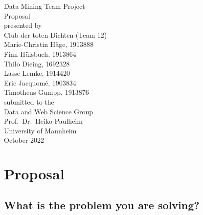 \documentclass[11pt,titlepage,oneside,openany]{book}
\begin{document}
\begin{titlepage}
	\vspace*{2cm}
  \begin{center}
   {\Large Data Mining Team Project\\}
   \vspace{2cm} 
   {Proposal\\}
   \vspace{2cm}
   {presented by\\
   	Club der toten Dichten (Team 12)\\
    Marie-Christin Häge, 1913888 \\
    Finn Hülsbuch, 1913864 \\
    Thilo Dieing, 1692328 \\
    Lasse Lemke, 1914420 \\
    Eric Jacquomé, 1903834 \\
    Timotheus Gumpp, 1913876 \\
   }
   \vspace{1cm} 
   {submitted to the\\
    Data and Web Science Group\\
    Prof.\ Dr.\ Heiko Paulheim\\
    University of Mannheim\\} \vspace{2cm}
   {October 2022}
  \end{center}
\end{titlepage} 






\newpage



\chapter{Proposal}
\section{What is the problem you are solving?}
\label{sec:problem}
\end{document}
